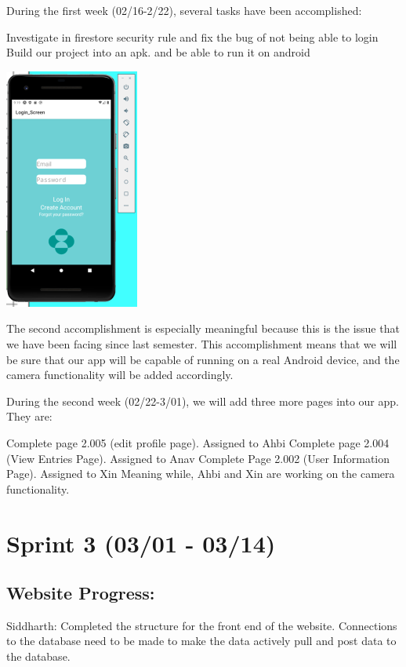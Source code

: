 \documentclass[]{book}
\begin{document}
During the first week (02/16-2/22), several tasks have been accomplished:

Investigate in firestore security rule and fix the bug of not being able to login
Build our project into an apk. and be able to run it on android

\includegraphics{images/mobile_signin.png}

The second accomplishment is especially meaningful because this is the issue that we have been facing since last semester. This accomplishment means that we will be sure that our app will be capable of running on a real Android device, and the camera functionality will be added accordingly.

During the second week (02/22-3/01), we will add three more pages into our app. They are:

Complete page 2.005 (edit profile page). Assigned to Ahbi
Complete page 2.004 (View Entries Page). Assigned to Anav
Complete Page 2.002 (User Information Page). Assigned to Xin
Meaning while, Ahbi and Xin are working on the camera functionality.

\hypertarget{sprint-3-0301---0314}{%
\section{Sprint 3 (03/01 - 03/14)}\label{sprint-3-0301---0314}}

\hypertarget{website-progress-2}{%
\subsection{Website Progress:}\label{website-progress-2}}

Siddharth: Completed the structure for the front end of the website. Connections to the database need to be made to make the data actively pull and post data to the database.
\end{document}
